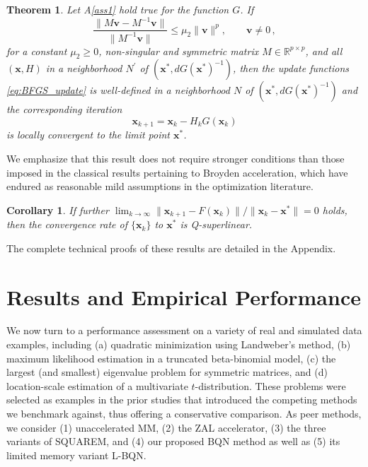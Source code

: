 \documentclass{statsoc}
\newtheorem{theorem}{Theorem}
\newtheorem{corollary}{Corollary}
\newcommand{\bv}{\boldsymbol{v}}
\newcommand{\bx}{\boldsymbol{x}}
\begin{document}
\begin{theorem} \label{th:qnm_convergence}
Let A\ref{ass1} hold true for the function $G
$. If 
\begin{equation} \label{eq:ineq3}
    \dfrac{\|M\bv - M^{-1}\bv\|}{\|M^{-1}\bv\|} \leq \mu_2\|\bv\|^p,\qquad \bv \neq 0\,,
\end{equation}
for a constant $\mu_2 \geq 0$, non-singular and symmetric matrix $M \in \mathbb{R}^{p \times p}$, and all $(\bx, H)$ in a neighborhood $N^\prime$ of $(\bx^\ast, dG(\bx^\ast)^{-1})$, then the update functions \eqref{eq:BFGS_update} is well-defined in a neighborhood $N$ of $(\bx^\ast, dG(\bx^\ast)^{-1})$ and the corresponding iteration
\[
\bx_{k+1} = \bx_k - H_kG(\bx_k)
\]
is locally convergent to the limit point $\bx^\ast$. 
\end{theorem}
We emphasize that this result does not require stronger conditions than those imposed in the classical results pertaining to Broyden acceleration, %
which have endured as  reasonable mild assumptions in the optimization literature. 
\begin{corollary} \label{cor:q-superlinear}
If further $\displaystyle \lim_{k \to \infty}\|\bx_{k+1} - F(\bx_k)\|/\|\bx_k - \bx^\ast\| = 0$ holds, then the convergence rate of $\{ \bx_k \} $ to $\bx^\ast$ is Q-superlinear.
\end{corollary}
The complete technical proofs of these results are detailed in the Appendix.

\section{Results and Empirical Performance} \label{subsec:BFGSex}

We now turn to a  performance assessment %
on a variety of real and simulated data examples, including (a) quadratic minimization using Landweber's method, (b) maximum likelihood estimation in a truncated beta-binomial model, (c) the largest (and smallest) eigenvalue problem for symmetric matrices, and (d) location-scale estimation of a multivariate $t$-distribution. %
These problems were selected as examples in the prior studies that introduced the competing methods we benchmark against, thus offering a conservative comparison.
As peer methods, we consider (1) unaccelerated MM, (2) the ZAL accelerator, %
(3) the three variants of SQUAREM, and (4) our proposed BQN method as well as (5) its limited memory variant L-BQN.
\end{document}
